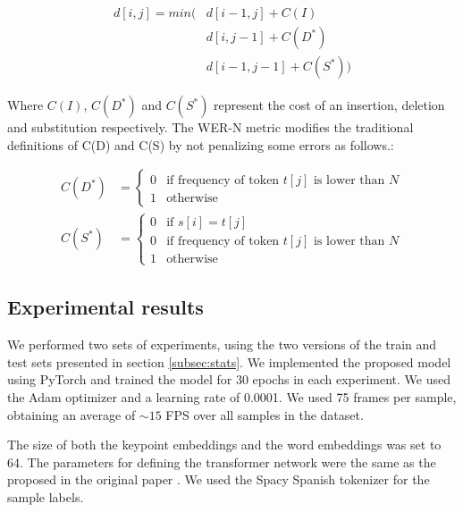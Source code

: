 \begin{equation}
\begin{split}
    d[i,j] = min( &
       d[i-1,j] + C(I)\\
       & d[i,j-1] + C(D^*)\\
       & d[i-1,j-1] + C(S^*))
\end{split}
\end{equation}

Where \(C(I)\), \(C(D^*)\) and \(C(S^*)\) represent the cost of an insertion, deletion and substitution respectively. The WER-N metric modifies the traditional definitions of C(D) and C(S) by not penalizing some errors as follows.:

\begin{equation}
\begin{split}
    C(D^*) & =
        \begin{cases}
            0 & \text{if frequency of token } t[j] \text{ is lower than } N \\
            1 & \text{otherwise}
        \end{cases}\\
    C(S^*) & =
        \begin{cases}
            0 & \text{if } s[i]=t[j]\\
            0 & \text{if frequency of token } t[j] \text{ is lower than } N \\
            1 & \text{otherwise}
        \end{cases}
\end{split}
\end{equation}

\subsection{Experimental results}

We performed two sets of experiments, using the two versions of the train and test sets presented in section \ref{subsec:stats}. We implemented the proposed model using PyTorch 
and trained the model for 30 epochs in each experiment. We used the Adam optimizer
and a learning rate of 0.0001. We used 75 frames per sample, obtaining an average of \(\sim15\) FPS over all samples in the dataset.

The size of both the keypoint embeddings and the word embeddings was set to 64. The parameters for defining the transformer network were the same as the proposed in the original paper \cite{vaswani2017attention}. We used the Spacy Spanish \cite{spacy2} tokenizer for the sample labels.

